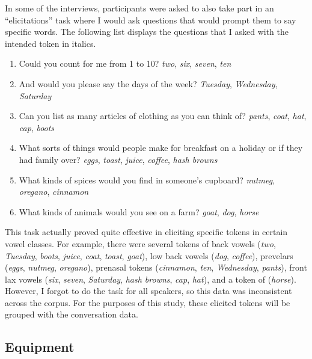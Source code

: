 In some of the interviews, participants were asked to also take part in an “elicitations” task where I would ask questions that would prompt them to say specific words. The following list displays the questions that I asked with the intended token in italics.
\begin{enumerate}
    \item Could you count for me from 1 to 10? \textit{two}, \textit{six}, \textit{seven}, \textit{ten}
    \item And would you please say the days of the week? \textit{Tuesday}, \textit{Wednesday}, \textit{Saturday}
    \item Can you list as many articles of clothing as you can think of? \textit{pants}, \textit{coat}, \textit{hat}, \textit{cap}, \textit{boots}
    \item What sorts of things would people make for breakfast on a holiday or if they had family over? \textit{eggs}, \textit{toast}, \textit{juice}, \textit{coffee}, \textit{hash browns}
    \item What kinds of spices would you find in someone’s cupboard? \textit{nutmeg}, \textit{oregano}, \textit{cinnamon}
    \item What kinds of animals would you see on a farm? \textit{goat}, \textit{dog}, \textit{horse}
\end{enumerate}
This task actually proved quite effective in eliciting specific tokens in certain vowel classes. For example, there were several tokens of back vowels (\textit{two}, \textit{Tuesday}, \textit{boots}, \textit{juice}, \textit{coat}, \textit{toast}, \textit{goat}), low back vowels (\textit{dog}, \textit{coffee}), prevelars (\textit{eggs}, \textit{nutmeg}, \textit{oregano}), prenasal tokens (\textit{cinnamon}, \textit{ten}, \textit{Wednesday}, \textit{pants}), front lax vowels (\textit{six}, \textit{seven}, \textit{Saturday}, \textit{hash browns}, \textit{cap}, \textit{hat}), and a token of \north (\textit{horse}). However, I forgot to do the task for all speakers, so this data was inconsistent across the corpus. For the purposes of this study, these elicited tokens will be grouped with the conversation data.

\subsection{Equipment}

